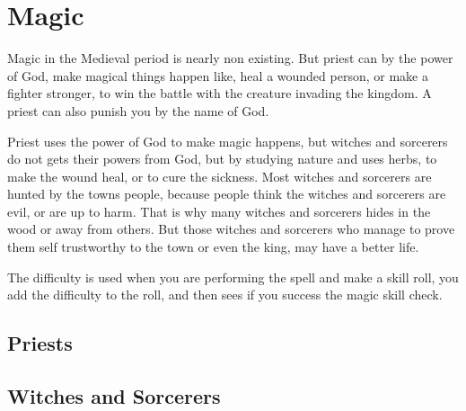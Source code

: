 \chapter{Magic}
Magic in the Medieval period is nearly non existing.
But priest can by the power of God, make magical things happen like, heal a wounded person, or make a fighter stronger, to win the battle with the creature invading the kingdom.
A priest can also punish you by the name of God.

Priest uses the power of God to make magic happens, but witches and sorcerers do not gets their powers from God, but by studying nature and uses herbs, to make the wound heal, or to cure the sickness.
Most witches and sorcerers are hunted by the towns people, because people think the witches and sorcerers are evil, or are up to harm.
That is why many witches and sorcerers hides in the wood or away from others.
But those witches and sorcerers who manage to prove them self trustworthy to the town or even the king, may have a better life.


The difficulty is used when you are performing the spell and make a skill roll, you add the difficulty to the roll, and then sees if you success the magic skill check.
\section{Priests}




\section{Witches and Sorcerers}


